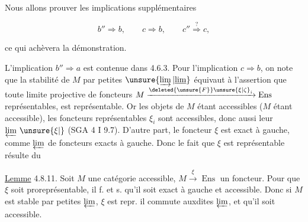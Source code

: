 
Nous allons prouver les implications supplémentaires

\[
b''\Longrightarrow b,\qquad c\Longrightarrow b,\qquad c''\overset{?}{\Longrightarrow}c,
\]

ce qui achèvera la démonstration.

L'implication $b''\Longrightarrow a$ est contenue dans 4.6.3. Pour l'implication $c\Longrightarrow b$, on note que la stabilité de  $M$ par petites $\unsure{\varinjlim|\underline{\lim}}$ équivaut à l'assertion que toute  limite projective \deleted{$\unsure{\xi}$} de foncteurs $M\xrightarrow{\deleted{\unsure{F}}\unsure{\xi|\zeta}_i}\operatorname{Ens}$ représentables, est représentable. Or les objets de $M$ étant accessibles ($M$ étant accessible), les foncteurs représentables $\xi_i$ sont accessibles, donc aussi leur $\varprojlim\,\unsure{\xi|{}}$ (SGA 4 I 9.7). D'autre part, le foncteur $\xi$ est exact à gauche, comme $\varprojlim$ de foncteurs  exacts à gauche. Donc le fait que $\xi$ est représentable résulte du

\uline{Lemme} 4.8.11. Soit $M$ une catégorie accessible,   $M\xrightarrow{\xi}\operatorname{Ens}$ un foncteur. Pour que $\xi$ soit proreprésentable, il f. et s. qu'il soit exact à gauche et accessible. Donc  si $M$ est stable par petites $\varprojlim$, $\xi$ est repr.  il commute auxdites $\varprojlim$, et qu'il soit accessible.
